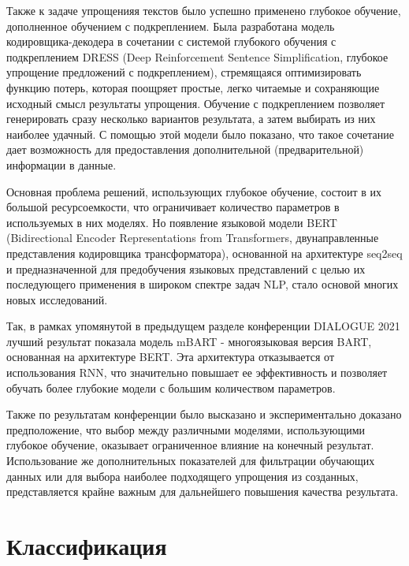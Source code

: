 Также к задаче упрощенияя текстов было успешно применено глубокое обучение, дополненное обучением с подкреплением\cite{zhang_sentence_2017}. Была разработана модель кодировщика-декодера в сочетании с системой глубокого обучения с подкреплением DRESS (Deep Reinforcement Sentence Simplification, глубокое упрощение предложений с подкреплением), стремящаяся оптимизировать функцию потерь, которая поощряет простые, легко читаемые и сохраняющие исходный смысл результаты упрощения. Обучение с подкреплением позволяет генерировать сразу несколько вариантов результата, а затем выбирать из них наиболее удачный. С помощью этой модели было показано, что такое сочетание дает возможность для предоставления дополнительной (предварительной) информации в данные.

Основная проблема решений, использующих глубокое обучение, состоит в их большой ресурсоемкости, что ограничивает количество параметров в используемых в них моделях. Но появление языковой модели BERT\cite{devlin_bert_2019} (Bidirectional Encoder Representations from Transformers, двунаправленные представления кодировщика трансформатора), основанной на архитектуре seq2seq и предназначенной для предобучения языковых представлений с целью их последующего применения в широком спектре задач NLP, стало основой многих новых исследований. 


Так, в рамках упомянутой в предыдущем разделе конференции DIALOGUE 2021 лучший результат показала модель mBART - многоязыковая версия BART, основанная на архитектуре BERT. Эта архитектура отказывается от использования RNN, что значительно повышает ее эффективность и позволяет обучать более глубокие модели с большим количеством параметров.

Также по результатам конференции было высказано и экспериментально доказано предположение, что выбор между различными моделями, использующими глубокое обучение, оказывает ограниченное влияние на конечный результат. Использование же дополнительных показателей для фильтрации обучающих данных или для выбора наиболее подходящего упрощения из созданных, представляется крайне важным для дальнейшего повышения качества результата. 

\section{Классификация}

